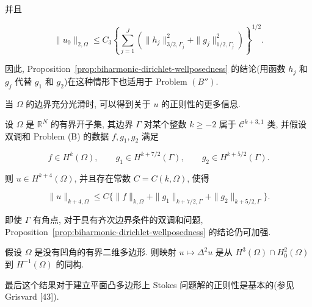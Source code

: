 并且

\[
\|u_0\|_{2,\Omega}\leq C_3\left\{\sum_{j=1}^J(\|h_j\|_{3/2,\Gamma_j}^2+\|g_j\|_{1/2,\Gamma_j}^2)\right\}^{1/2}.
\]

因此, Proposition~\ref{prop:biharmonic-dirichlet-wellposedness} 的结论(用函数 $h_j$ 和 $g_j$
代替 $g_1$ 和 $g_2$)在这种情形下也适用于 Problem $(B'')$.

当 $\Omega$ 的边界充分光滑时, 可以得到关于 $u$ 的正则性的更多信息.

\setcounter{statement}{10}
\renewcommand{\theHstatement}{theorem.\thesection.\arabic{statement}}
\begin{Theorem}\label{thm:biharmonic-smooth-boundary-regularity}
设 $\Omega$ 是 $\mathbb R^N$ 的有界开子集, 其边界 $\Gamma$ 对某个整数 $k\geq-2$ 属于 $\mathcal C^{k+3,1}$ 类, 并假设双调和 Problem (B) 的数据 $f,g_1,g_2$ 满足

\[
f\in H^k(\Omega),\qquad g_1\in H^{k+7/2}(\Gamma),\qquad g_2\in H^{k+5/2}(\Gamma).
\]

则 $u\in H^{k+4}(\Omega)$, 并且存在常数 $C=C(k,\Omega)$, 使得

\begin{equation}\label{eq:biharmonic-regularity-hk}
\|u\|_{k+4,\Omega}\leq C\{\|f\|_{k,\Omega}+\|g_1\|_{k+7/2,\Gamma}+\|g_2\|_{k+5/2,\Gamma}\}.
\end{equation}
\end{Theorem}

即使 $\Gamma$ 有角点, 对于具有齐次边界条件的双调和问题,
Proposition~\ref{prop:biharmonic-dirichlet-wellposedness} 的结论仍可加强.

\setcounter{statement}{11}
\renewcommand{\theHstatement}{theorem.\thesection.\arabic{statement}}
\begin{Theorem}\label{thm:biharmonic-convex-polygon-regularity}
假设 $\Omega$ 是没有凹角的有界二维多边形. 则映射 $u\mapsto\Delta^2u$ 是从
$H^3(\Omega)\cap H_0^2(\Omega)$ 到 $H^{-1}(\Omega)$ 的同构.
\end{Theorem}

最后这个结果对于建立平面凸多边形上 Stokes 问题解的正则性是基本的(参见 Grisvard [43]).
